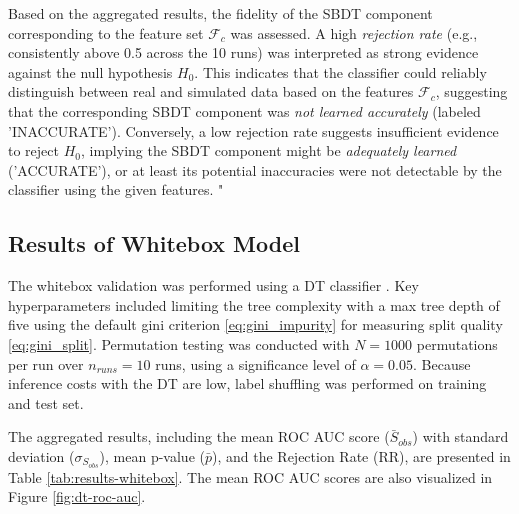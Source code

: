 Based on the aggregated results, the fidelity of the SBDT component corresponding to the feature set $\mathcal{F}_c$ was assessed. A high \textit{rejection rate} (e.g., consistently above 0.5 across the 10 runs) was interpreted as strong evidence against the null hypothesis $H_0$. This indicates that the classifier could reliably distinguish between real and simulated data based on the features $\mathcal{F}_c$, suggesting that the corresponding SBDT component was \textit{not learned accurately} (labeled 'INACCURATE'). Conversely, a low rejection rate suggests insufficient evidence to reject $H_0$, implying the SBDT component might be \textit{adequately learned} ('ACCURATE'), or at least its potential inaccuracies were not detectable by the classifier using the given features.
"
\subsection*{Results of Whitebox Model}

The whitebox validation was performed using a DT classifier \autocite{Scikit-Learn}. Key hyperparameters included limiting the tree complexity with a max tree depth of five using the default gini criterion \autoref{eq:gini_impurity} for measuring split quality \autoref{eq:gini_split}. Permutation testing was conducted with $N = 1000$ permutations per run over $n_{runs}=10$ runs, using a significance level of $\alpha = 0.05$. Because inference costs with the DT are low, label shuffling was performed on training and test set.

The aggregated results, including the mean ROC AUC score ($\bar{S}_{obs}$) with standard deviation ($\sigma_{S_{obs}}$), mean p-value ($\bar{p}$), and the Rejection Rate (RR), are presented in Table \ref{tab:results-whitebox}. The mean ROC AUC scores are also visualized in Figure \ref{fig:dt-roc-auc}.

